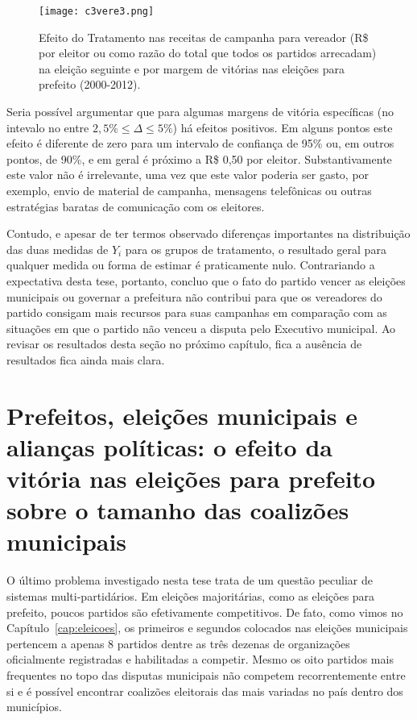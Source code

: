 \begin{figure}[htp]
	\centering
	\texttt{[image: c3vere3.png]}
	\caption{Efeito do Tratamento nas receitas de campanha para vereador (R\$ por eleitor ou como razão do total que todos os partidos arrecadam) na eleição seguinte e por margem de vitórias nas eleições para prefeito (2000-2012).}
	\label{fig:c3vere3}
\end{figure}

Seria possível argumentar que para algumas margens de vitória específicas (no intevalo no entre $2,5\% \leq \Delta \leq 5\%$) há efeitos positivos. Em alguns pontos este efeito é diferente de zero para um intervalo de confiança de 95\% ou, em outros pontos, de 90\%, e em geral é próximo a R\$ 0,50 por eleitor. Substantivamente este valor não é irrelevante, uma vez que este valor poderia ser gasto, por exemplo, envio de material de campanha, mensagens telefônicas ou outras estratégias baratas de comunicação com os eleitores. 

Contudo, e apesar de ter termos observado diferenças importantes na distribuição das duas medidas de $Y_{i}$ para os grupos de tratamento, o resultado geral para qualquer medida ou forma de estimar é praticamente nulo. Contrariando a expectativa desta tese, portanto, concluo que o fato do partido vencer as eleições municipais ou governar a prefeitura não contribui para que os vereadores do partido consigam mais recursos para suas campanhas em comparação com as situações em que o partido não venceu a disputa pelo Executivo municipal. Ao revisar os resultados desta seção no próximo capítulo, fica a ausência de resultados fica ainda mais clara.

\section{Prefeitos, eleições municipais e alianças políticas: o efeito da vitória nas eleições para prefeito sobre o tamanho das coalizões municipais}

O último problema investigado nesta tese trata de um questão peculiar de sistemas multi-partidários. Em eleições majoritárias, como as eleições para prefeito, poucos partidos são efetivamente competitivos. De fato, como vimos no Capítulo~\ref{cap:eleicoes}, os primeiros e segundos colocados nas eleições municipais pertencem a apenas 8 partidos dentre as três dezenas de organizações oficialmente registradas e habilitadas a competir. Mesmo os oito partidos mais frequentes no topo das disputas municipais não competem recorrentemente entre si e é possível encontrar coalizões eleitorais das mais variadas no país dentro dos municípios.

